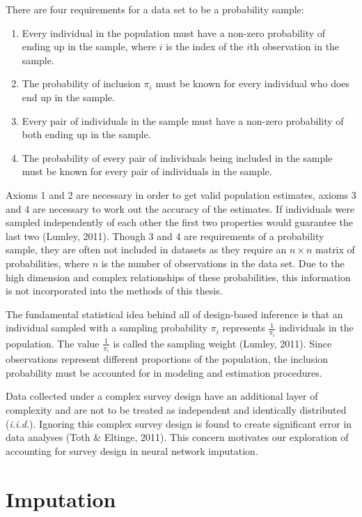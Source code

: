 \documentclass[12pt,twoside]{reedthesis}
\begin{document}
There are four requirements for a data set to be a probability sample:
\begin{enumerate}
\def\labelenumi{\arabic{enumi}.}
\item
  Every individual in the population must have a non-zero probability of
  ending up in the sample, where \(i\) is the index of the \(i\)th
  observation in the sample.
\item
  The probability of inclusion \(\pi_i\) must be known for every
  individual who does end up in the sample.
\item
  Every pair of individuals in the sample must have a non-zero
  probability of both ending up in the sample.
\item
  The probability of every pair of individuals being included in the
  sample must be known for every pair of individuals in the sample.
\end{enumerate}
Axioms 1 and 2 are necessary in order to get valid population estimates,
axioms 3 and 4 are necessary to work out the accuracy of the estimates.
If individuals were sampled independently of each other the first two
properties would guarantee the last two (Lumley, 2011). Though 3 and 4
are requirements of a probability sample, they are often not included in
datasets as they require an \(n \times n\) matrix of probabilities,
where \(n\) is the number of observations in the data set. Due to the
high dimension and complex relationships of these probabilities, this
information is not incorporated into the methods of this thesis.

The fundamental statistical idea behind all of design-based inference is
that an individual sampled with a sampling probability \(\pi_i\)
represents \(\frac{1}{\pi_i}\) individuals in the population. The value
\(\frac{1}{\pi_i}\) is called the sampling weight (Lumley, 2011). Since
observations represent different proportions of the population, the
inclusion probability must be accounted for in modeling and estimation
procedures.

Data collected under a complex survey design have an additional layer of
complexity and are not to be treated as independent and identically
distributed (\emph{i.i.d.}). Ignoring this complex survey design is
found to create significant error in data analyses (Toth \& Eltinge,
2011). This concern motivates our exploration of accounting for survey
design in neural network imputation.

\section{Imputation}\label{imputation}
\end{document}

